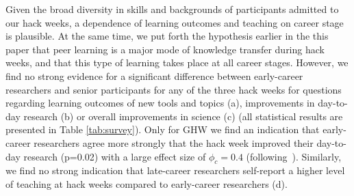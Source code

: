 Given the broad diversity in skills and backgrounds of participants admitted to our hack weeks, a dependence of learning outcomes and teaching on career stage is plausible. At the same time, we put forth the hypothesis earlier in the this paper that peer learning is a major mode of knowledge transfer during hack weeks, and that this type of learning takes place at all career stages. However, we find no strong evidence for a significant difference between early-career researchers and senior participants for any of the three hack weeks for questions regarding learning outcomes of new tools and topics (a), improvements in day-to-day research (b) or overall improvements in science (c) (all statistical results are presented in Table \ref{tab:survey}). Only for GHW we find an indication that early-career researchers agree more strongly that the hack week improved their day-to-day research (p=0.02) with a large effect size of $\phi_c = 0.4$ (following~\citep{cohen1988}). 
Similarly, we find no strong indication that late-career researchers self-report a higher level of teaching at hack weeks compared to early-career researchers (d).

